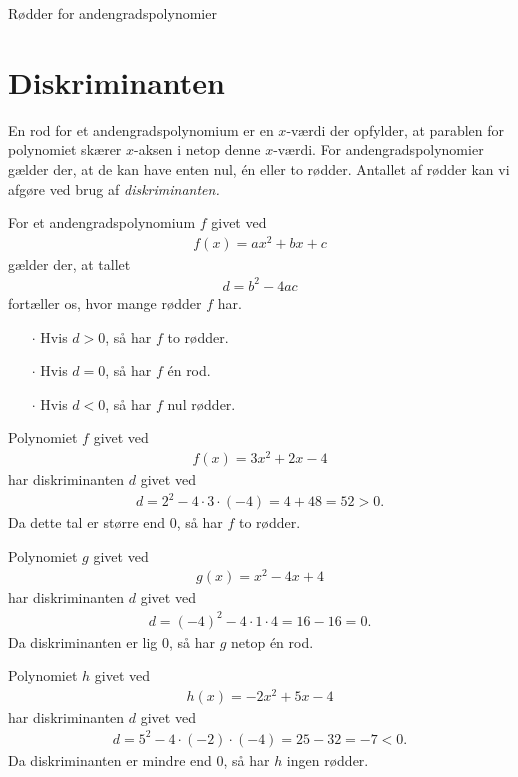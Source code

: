 \begin{center}
\Huge
Rødder for andengradspolynomier
\end{center}
\section*{Diskriminanten}

En rod for et andengradspolynomium er en $x$-værdi der opfylder, at parablen for polynomiet skærer $x$-aksen i netop denne $x$-værdi. For andengradspolynomier gælder der, at de kan have enten nul, én eller to rødder. Antallet af rødder kan vi afgøre ved brug af \textit{diskriminanten.} 
\begin{setn}[Diskriminanten]
	For et andengradspolynomium $f$ givet ved
	\begin{align*}
		f(x) = ax^2+bx+c
	\end{align*}
	gælder der, at tallet 
	\begin{align*}
		d = b^2 - 4ac
	\end{align*}
	fortæller os, hvor mange rødder $f$ har. 
	\begin{itemize}
		\item[$\cdot$] Hvis $d > 0$, så har $f$ to rødder.
		\item[$\cdot$] Hvis $d = 0$, så har $f$ én rod.
		\item[$\cdot$] Hvis $d < 0$, så har $f$ nul rødder. 
	\end{itemize}
\end{setn}

\begin{exa}
	Polynomiet $f$ givet ved
	\begin{align*}
		f(x) = 3x^2 +2x-4
	\end{align*}
	har diskriminanten $d$ givet ved
	\begin{align*}
		d = 2^2 - 4 \cdot 3 \cdot (-4) = 4 + 48 = 52 > 0.
	\end{align*}
	Da dette tal er større end 0, så har $f$ to rødder.
\end{exa}
\begin{exa}
	Polynomiet $g$ givet ved
	\begin{align*}
		g(x) = x^2 -4x + 4
	\end{align*}
	har diskriminanten $d$ givet ved
	\begin{align*}
		d = (-4)^2-4\cdot 1 \cdot 4 = 16 - 16 = 0.
	\end{align*}
	Da diskriminanten er lig $0$, så har $g$ netop én rod.
\end{exa}
\begin{exa}
	Polynomiet $h$ givet ved
	\begin{align*}
		h(x) = -2x^2 + 5x - 4
	\end{align*}
	har diskriminanten $d$ givet ved
	\begin{align*}
		d = 5^2 - 4\cdot (-2) \cdot (-4) = 25-32 = -7 < 0.
	\end{align*}
	Da diskriminanten er mindre end 0, så har $h$ ingen rødder. 
\end{exa}


